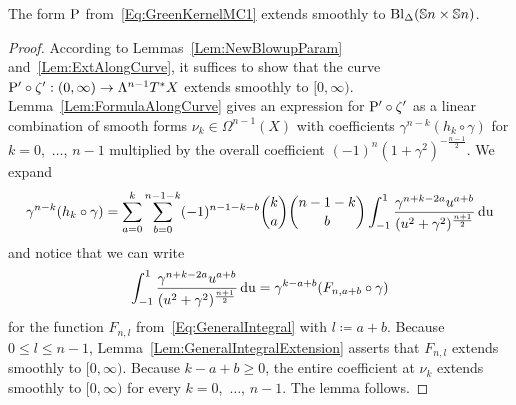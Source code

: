 \documentclass[\MainFolder/Text.tex]{subfiles}
\begin{document}
\begin{Proposition}\label{Prop:GKerBdd}
The form $\mathrm{P}$ from~\eqref{Eq:GreenKernelMC1} extends smoothly to $\mathrm{Bl}_\Delta(\mathbb{S}{n}\times\mathbb{S}{n})$.
\end{Proposition}
%
\begin{proof}
According to Lemmas~\ref{Lem:NewBlowupParam} and~\ref{Lem:ExtAlongCurve}, it suffices to show that the curve $\mathrm{P}'\circ \zeta': (0,\infty)\rightarrow \Lambda^{n-1}T^* X$ extends smoothly to $[0,\infty)$. Lemma~\ref{Lem:FormulaAlongCurve} gives an expression for $\mathrm{P}'\circ \zeta'$ as a linear combination of smooth forms $\nu_{k}\in \Omega^{n-1}(X)$ with coefficients $\gamma^{n-k}(h_{k}\circ \gamma)$ for $k=0$,~$\dotsc$, $n-1$ multiplied by the overall coefficient $(-1)^n (1+\gamma^2)^{-\frac{n-1}{2}}$. We expand
\begin{equation*}
\gamma^{n-k}(h_{k}\circ\gamma) = \sum_{a=0}^k\sum_{b=0}^{n-1-k}(-1)^{n-1-k-b} \binom{k}{a} \binom{n-1-k}{b} \int_{-1}^1 \frac{\gamma^{n+k-2a}u^{a+b}}{(u^2+\gamma^2)^{\frac{n+1}{2}}} \operatorname{du}
\end{equation*}
and notice that we can write
\begin{equation*}
 \int_{-1}^1 \frac{\gamma^{n+k-2a}u^{a+b}}{(u^2+\gamma^2)^{\frac{n+1}{2}}} \operatorname{du} = \gamma^{k-a+b}(F_{n,a+b}\circ \gamma)
\end{equation*}
for the function $F_{n,l}$ from~\eqref{Eq:GeneralIntegral} with $l\coloneqq a+b$. Because $0\le l \le n-1$, Lemma~\ref{Lem:GeneralIntegralExtension} asserts that $F_{n,l}$ extends smoothly to $[0,\infty)$. Because $k-a+b\ge 0$, the entire coefficient at $\nu_{k}$ extends smoothly to $[0,\infty)$ for every $k=0$,~$\dotsc$, $n-1$. The lemma follows.
\end{proof}

\end{document}

